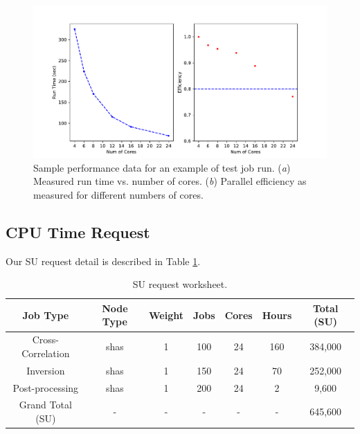 \documentclass[10pt, letterpaper]{article}
\begin{document}
\begin{figure}
\centering
\includegraphics[width=\textwidth, keepaspectratio=true]{scaling.pdf}
\caption{\label{fig:scaling} Sample performance data for an example of test job run. (\textit{a}) Measured run time vs. number of cores.  (\textit{b}) Parallel efficiency as measured for different numbers of cores.}
\end{figure}

\subsection{CPU Time Request}\label{sec:request}

Our SU request detail is described in Table \ref{tab:worksheet}.

\begin{table}
\centering
\begin{tabular}{| c | c | c | c | c | c | c|}
\hline
 Job Type           & Node Type & Weight & Jobs  & Cores  & Hours & Total (SU)  \\\hline
Cross-Correlation   & shas      & 1      & 100    & 24     & 160   & 384,000 \\
Inversion           & shas      & 1      & 150   & 24     & 70    & 252,000 \\ 
Post-processing     & shas      & 1      & 200   & 24     & 2     & 9,600 \\\hline
Grand Total (SU)    & -         & -      &-      & -      &-      &  645,600 \\\hline
\end{tabular}
\caption{\label{tab:worksheet}SU request worksheet.}
\end{table}
\end{document}
